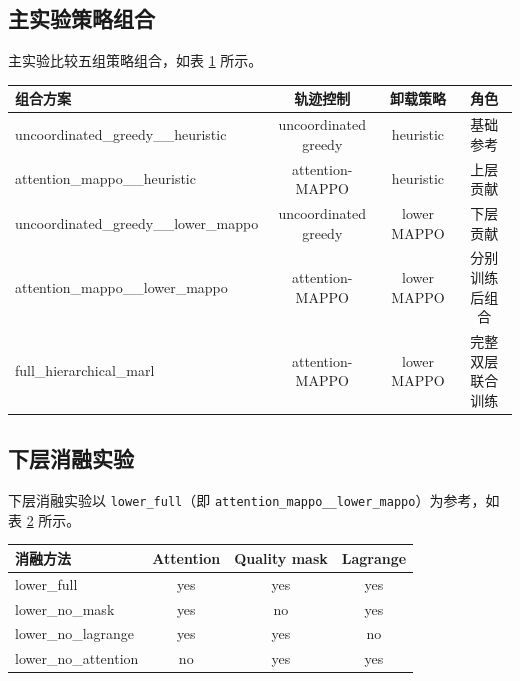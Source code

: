 \subsection{主实验策略组合}

主实验比较五组策略组合，如表 \ref{tab:main-strategies} 所示。

\begin{table}[!htbp]
    \centering
    \label{tab:main-strategies}
    \begin{tabular}{|l|c|c|c|}
        \hline
        组合方案 & 轨迹控制 & 卸载策略 & 角色 \\
        \hline
        uncoordinated\_greedy\_\_heuristic & uncoordinated greedy & heuristic & 基础参考 \\
        attention\_mappo\_\_heuristic & attention-MAPPO & heuristic & 上层贡献 \\
        uncoordinated\_greedy\_\_lower\_mappo & uncoordinated greedy & lower MAPPO & 下层贡献 \\
        attention\_mappo\_\_lower\_mappo & attention-MAPPO & lower MAPPO & 分别训练后组合 \\
        full\_hierarchical\_marl & attention-MAPPO & lower MAPPO & 完整双层联合训练 \\
        \hline
    \end{tabular}
\end{table}

\subsection{下层消融实验}

下层消融实验以 \texttt{lower\_full}（即 \texttt{attention\_mappo\_\_lower\_mappo}）为参考，如表 \ref{tab:ablation-strategies} 所示。

\begin{table}[!htbp]
    \centering
    \label{tab:ablation-strategies}
    \begin{tabular}{|l|c|c|c|}
        \hline
        消融方法 & Attention & Quality mask & Lagrange \\
        \hline
        lower\_full & yes & yes & yes \\
        lower\_no\_mask & yes & no & yes \\
        lower\_no\_lagrange & yes & yes & no \\
        lower\_no\_attention & no & yes & yes \\
        \hline
    \end{tabular}
\end{table}

